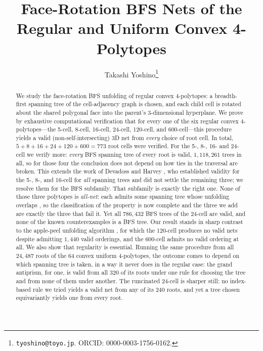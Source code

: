 \documentclass[11pt,letterpaper]{article}
\title{Face-Rotation BFS Nets of the Regular and Uniform
  Convex 4-Polytopes}
\author{Takashi Yoshino\thanks{%
  \texttt{tyoshino@toyo.jp}.
  ORCID: 0000-0003-1756-0162.}}
\date{}
\begin{document}
\maketitle

\begin{abstract}
We study the face-rotation BFS unfolding of regular convex 4-poly\-topes:
a breadth-first spanning tree of the cell-adjacency graph is chosen,
and each child cell is rotated about the shared polygonal face into
the parent's 3-dimensional hyperplane.
We prove by exhaustive computational verification that for every one
of the six regular convex 4-polytopes---the 5-cell, 8-cell, 16-cell,
24-cell, 120-cell, and 600-cell---this procedure yields a valid
(non-self-intersecting) 3D net from \emph{every} choice of root cell.
In total, $5+8+16+24+120+600 = 773$ root cells were verified.
For the 5-, 8-, 16- and 24-cell we verify more: \emph{every} BFS
spanning tree of every root is valid, $1{,}118{,}261$ trees in all, so
for those four the conclusion does not depend on how ties in the
traversal are broken.
This extends the work of Devadoss and Harvey
\cite{DevadossHarvey2022}, who established validity for the 5-, 8-,
and 16-cell for \emph{all} spanning trees and did not settle the
remaining three; we resolve them for the BFS subfamily.
That subfamily is exactly the right one.
None of those three polytopes is \emph{all-net}: each admits some
spanning tree whose unfolding overlaps
\cite{Seamons2026,DevadossHarveyRichter2026}, so the classification of
the property is now complete and the three we add are exactly the three
that fail it.
Yet all $786{,}432$ BFS trees of the 24-cell are valid, and none of the
known counterexamples is a BFS tree.
Our result stands in sharp contrast to the apple-peel
unfolding algorithm \cite{YoshinoChaidee2026}, for which the 120-cell
produces no valid nets despite admitting $1{,}440$ valid orderings,
and the 600-cell admits no valid ordering at all.
We also show that regularity is essential.
Running the same procedure from all $24{,}487$ roots of the 64 convex
uniform 4-polytopes, the outcome comes to depend on which spanning tree
is taken, in a way it never does in the regular case: the grand
antiprism, for one, is valid from all $320$ of its roots under one rule
for choosing the tree and from none of them under another.
The runcinated 24-cell is sharper still: no index-based rule we tried
yields a valid net from any of its $240$ roots, and yet a tree chosen
equivariantly yields one from every root.
\end{abstract}
\end{document}
